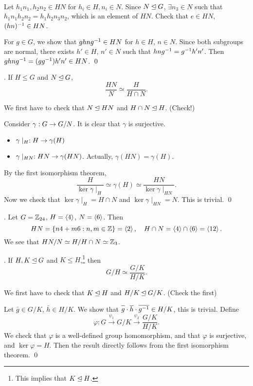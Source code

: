\pf \\
 Let \(h_1n_1, h_2n_2 \in HN\) for \(h_i \in H, n_i \in N\). Since \(N \unlhd G\), \(\exists n_3 \in N\) such that \(h_1 n_1 h_2 n_2 = h_1 h_2 n_3 n_2\), which is an element of \(HN\). Check that \(e \in HN\), \((hn)^{-1} \in HN\).

 For \(g \in G\), we show that \(ghng^{-1} \in HN\) for \(h \in H\), \(n \in N\). Since both subgroups are normal, there exists \(h' \in H\), \(n' \in N\) such that \(hng^{-1} = g^{-1} h' n'\). Then \(ghng^{-1} = (gg^{-1})h'n' \in HN\). \qed

\medskip

\thm.  If \(H \leq G\) and \(N \unlhd G\),
\[
    \frac{HN}{N} \simeq \frac{H}{H\cap N}.
\]

\pf We first have to check that \(N \unlhd HN\) and \(H\cap N \unlhd H\). (Check!)

Consider \(\gamma : G \rightarrow G/N\). It is clear that \(\gamma\) is surjective.
\begin{itemize}
    \item \(\gamma \mid_H: H \rightarrow \gamma(H)\)
    \item \(\gamma \mid_{HN}: HN \rightarrow \gamma(HN)\). Actually, \(\gamma(HN) = \gamma(H)\).
\end{itemize}
By the first isomorphism theorem,
\[
    \frac{H}{\ker \gamma\mid_H} \simeq \gamma(H) \simeq \frac{HN}{\ker \gamma \mid_{HN}}.
\]
Now we check that \(\ker \gamma\mid_H = H \cap N\) and \(\ker \gamma\mid_{HN} = N\). This is trivial. \qed

\ex. Let \(G = \mathbb{Z}_{24}\), \(H = \left\langle 4 \right\rangle\), \(N = \left\langle 6 \right\rangle\). Then
\[
    HN = \{n4 + m6 : n, m \in \mathbb{Z}\} = \left\langle 2 \right\rangle, \quad H\cap N = \left\langle 4 \right\rangle\cap \left\langle 6 \right\rangle = \left\langle 12 \right\rangle.
\]
We see that \(HN / N \simeq H / H\cap N \simeq \mathbb{Z}_3\).

\medskip

\thm.  If \(H, K \unlhd G\) and \(K \leq H\),\footnote{This implies that \(K \unlhd H\).} then
\[
    G / H \simeq \frac{G/K}{H/K}.
\]

\pf We first have to check that \(K \unlhd H\) and \(H/K \unlhd G/K\). (Check the first)

Let \(\bar{g} \in G/K\), \(\bar{h} \in H/K\). We show that \(\bar{g} \cdot \bar{h} \cdot \bar{g\inv} \in H/K\), this is trivial. Define
\[
    \varphi : G \overset{\psi_1}{\longrightarrow} G/K \overset{\psi_2}{\longrightarrow} \frac{G/K}{H/K}.
\]
We check that \(\varphi\) is a well-defined group homomorphism, and that \(\varphi\) is surjective, and \(\ker \varphi = H\). Then the result directly follows from the first isomorphism theorem. \qed

